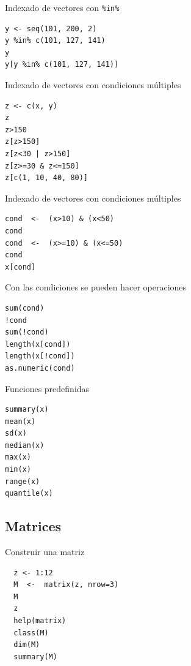 \documentclass[xcolor={usenames,svgnames,dvipsnames}]{beamer}
\begin{document}
\begin{frame}[fragile,label=sec-2-1-11]{Indexado de vectores con \texttt{\%in\%}}
 \lstset{language=R,label= ,caption= ,numbers=none}
\begin{lstlisting}
y <- seq(101, 200, 2)
y %in% c(101, 127, 141)
y
y[y %in% c(101, 127, 141)]
\end{lstlisting}
\end{frame}

\begin{frame}[fragile,label=sec-2-1-12]{Indexado de vectores con condiciones múltiples}
 \lstset{language=R,label= ,caption= ,numbers=none}
\begin{lstlisting}
z <- c(x, y)
z
z>150
z[z>150]
z[z<30 | z>150]
z[z>=30 & z<=150]
z[c(1, 10, 40, 80)]
\end{lstlisting}
\end{frame}

\begin{frame}[fragile,label=sec-2-1-13]{Indexado de vectores con condiciones múltiples}
 \lstset{language=R,label= ,caption= ,numbers=none}
\begin{lstlisting}
cond  <-  (x>10) & (x<50)
cond
cond  <-  (x>=10) & (x<=50)
cond
x[cond]
\end{lstlisting}
\end{frame}

\begin{frame}[fragile,label=sec-2-1-14]{Con las condiciones se pueden hacer operaciones}
 \lstset{language=R,label= ,caption= ,numbers=none}
\begin{lstlisting}
sum(cond)
!cond
sum(!cond)
length(x[cond])
length(x[!cond])
as.numeric(cond)
\end{lstlisting}
\end{frame}


\begin{frame}[fragile,label=sec-2-1-15]{Funciones predefinidas}
 \lstset{language=R,label= ,caption= ,numbers=none}
\begin{lstlisting}
summary(x)
mean(x)
sd(x)
median(x)
max(x)
min(x)
range(x)
quantile(x)
\end{lstlisting}
\end{frame}



\subsection{Matrices}
\label{sec-2-2}
\begin{frame}[fragile,label=sec-2-2-1]{Construir una matriz}
 \lstset{language=R,label= ,caption= ,numbers=none}
\begin{lstlisting}
  z <- 1:12
  M  <-  matrix(z, nrow=3)
  M
  z
  help(matrix)
  class(M)
  dim(M)
  summary(M)
\end{lstlisting}
\end{frame}
\end{document}
